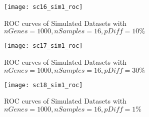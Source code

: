 \begin{figure}[h!tb] 
\texttt{[image: sc16\_sim1\_roc]}
\caption{ROC curves of Simulated Datasets with $nGenes=1000, nSamples=16, pDiff=10\%$}
\label{sc16_roc}
\end{figure}

\begin{figure}[h!tb] 
\texttt{[image: sc17\_sim1\_roc]}
\caption{ROC curves of Simulated Datasets with $nGenes=1000, nSamples=16, pDiff=30\%$}
\label{sc17_roc}
\end{figure}

\begin{figure}[h!tb] 
\texttt{[image: sc18\_sim1\_roc]}
\caption{ROC curves of Simulated Datasets with $nGenes=1000, nSamples=16, pDiff=1\%$}
\label{sc18_roc}
\end{figure}
